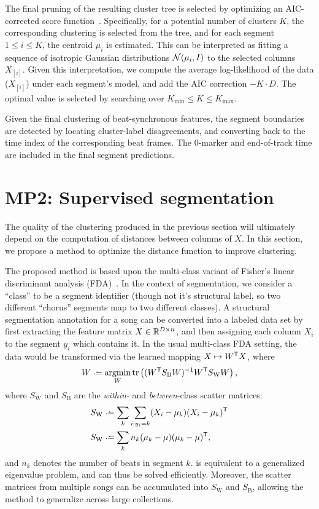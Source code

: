 \documentclass{article}
\begin{document}
The final pruning of the resulting cluster tree is selected by optimizing an AIC-corrected score 
function~\cite{akaike1973information}.  Specifically, for a potential number of clusters $K$, the corresponding
clustering is selected from the tree, and for each segment $1 \leq i \leq K$, the centroid $\mu_i$ is estimated.  
This can be interpreted as fitting a sequence of isotropic Gaussian distributions $\mathcal{N}(\mu_i, I)$ to the selected 
columns $X_{[i]}$. Given this interpretation, we compute the average log-likelihood of the data ($X_{[i]}$) under 
each segment's model, and add the AIC correction $-K\cdot D$.  The optimal value is selected by searching over
$K_{\min} \leq K \leq K_{\max}$.

Given the final clustering of beat-synchronous features, the segment boundaries are detected by locating
cluster-label disagreements, and converting back to the time index of the corresponding beat frames.  The
0-marker and end-of-track time are included in the final segment predictions.

\section{MP2: Supervised segmentation}
\label{sec:supervised}

The quality of the clustering produced in the previous section will ultimately depend on the computation of
distances between columns of $X$.  In this section, we propose a method to optimize the distance function to
improve clustering.

The proposed method is based upon the multi-class variant of Fisher's linear discriminant
analysis (FDA)~\cite{fisher1936use, fukunaga1990introduction}.  In the context of segmentation, we consider a 
``class'' to be a segment identifier (though not it's structural label, so two different ``chorus'' segments map to
two different classes).
A structural segmentation annotation for a song can be converted into a labeled data set by first extracting the 
feature matrix $X \in \mathbb{R}^{D\times n}$, and then assigning each column $X_i$ to the segment $y_i$ which contains 
it.  In the usual multi-class FDA setting, the data would be transformed via the learned mapping $X \mapsto
W^\mathsf{T} X$,
where
\begin{equation}
W \defeq \argmin_W \trace\left( (W\trans S_\text{B} W)^{-1} W\trans S_\text{W} W \right) \label{eq:fda},
\end{equation}
where $S_\text{W}$ and $S_\text{B}$ are the \emph{within-} and \emph{between}-class scatter matrices:
\begin{align*}
S_\text{W} & \defeq \sum_k \sum_{i : y_i = k} (X_i - \mu_k)(X_i - \mu_k)\trans\\
S_\text{W} & \defeq \sum_k n_k (\mu_k - \mu)(\mu_k - \mu)\trans,
\end{align*}
and $n_k$ denotes the number of beats in segment $k$.
 is equivalent to a generalized eigenvalue problem, and can thus be solved efficiently.  Moreover,
the scatter matrices from multiple songs can be accumulated into $S_\text{W}$ and $S_\text{B}$, allowing the
method to generalize across large collections.
\end{document}
